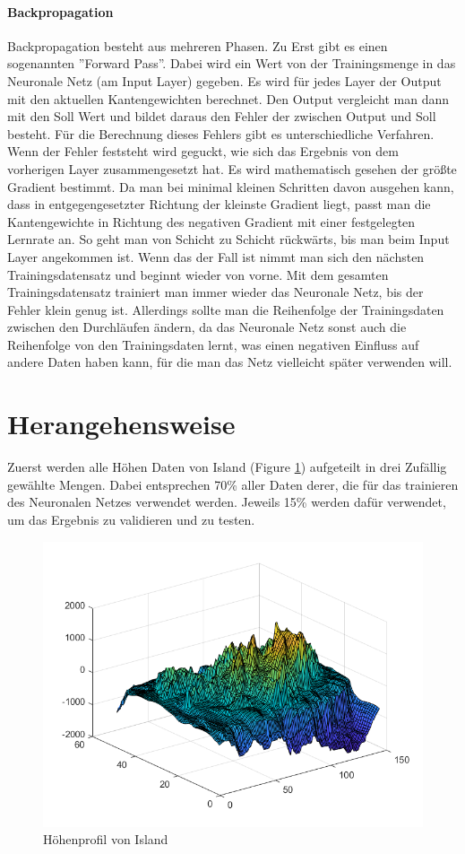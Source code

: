 \documentclass{hbrs-ecta-report}
\begin{document}
\paragraph{Backpropagation}
Backpropagation besteht aus mehreren Phasen. Zu Erst gibt es einen sogenannten ''Forward Pass''. Dabei wird ein Wert von der Trainingsmenge in das Neuronale Netz (am Input Layer) gegeben. Es wird für jedes Layer der Output mit den aktuellen Kantengewichten berechnet. Den Output vergleicht man dann mit den Soll Wert und bildet daraus den Fehler der zwischen Output und Soll besteht. Für die Berechnung dieses Fehlers gibt es unterschiedliche Verfahren. \\
Wenn der Fehler feststeht wird geguckt, wie sich das Ergebnis von dem vorherigen Layer zusammengesetzt hat. Es wird mathematisch gesehen der größte Gradient bestimmt. Da man bei minimal kleinen Schritten davon ausgehen kann, dass in entgegengesetzter Richtung der kleinste Gradient liegt, passt man die Kantengewichte in Richtung des negativen Gradient mit einer festgelegten Lernrate an. So geht man von Schicht zu Schicht rückwärts, bis man beim Input Layer angekommen ist.
Wenn das der Fall ist nimmt man sich den nächsten Trainingsdatensatz und beginnt wieder von vorne. Mit dem gesamten Trainingsdatensatz trainiert man immer wieder das Neuronale Netz, bis der Fehler klein genug ist. Allerdings sollte man die Reihenfolge der Trainingsdaten zwischen den Durchläufen ändern, da das Neuronale Netz sonst auch die Reihenfolge von den Trainingsdaten lernt, was einen negativen Einfluss auf andere Daten haben kann, für die man das Netz vielleicht später verwenden will.


\section{Herangehensweise}
 Zuerst werden alle Höhen Daten von Island (Figure \ref{fig:island}) aufgeteilt in drei Zufällig gewählte Mengen. Dabei entsprechen 70\% aller Daten derer, die für das trainieren des Neuronalen Netzes verwendet werden. Jeweils 15\% werden dafür verwendet, um das Ergebnis zu validieren und zu testen. 
\begin{figure}[h!]
	\includegraphics[width=\linewidth]{img/island}
	\caption{Höhenprofil von Island}
	\label{fig:island}
\end{figure}
\end{document}
